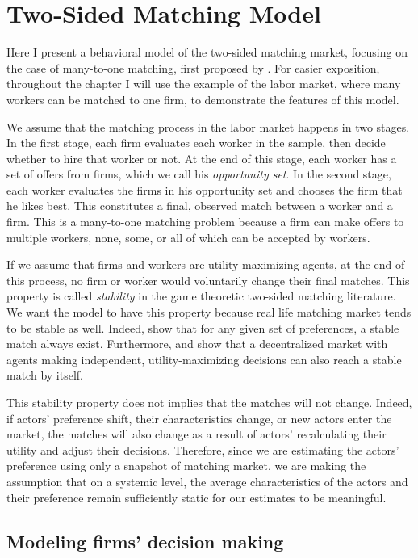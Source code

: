 \chapter{Two-Sided Matching Model}
\label{chap:model}

Here I present a behavioral model of the two-sided matching market, focusing on
the case of many-to-one matching, first proposed by \cite{Logan1996}. For easier exposition, throughout the chapter
I will use the example of the labor market, where many workers can be matched to
one firm, to demonstrate the features of this model.

We assume that the matching process in the labor market happens in two stages.
In the first stage, each firm evaluates each worker in the sample, then
decide whether to hire that worker or not. At the end of this stage, each worker
has a set of offers from firms, which we call his \textit{opportunity
  set}. In the second stage, each worker evaluates the firms in his
opportunity set and chooses the firm that he likes best. This constitutes a
final, observed match between a worker and a firm. This is a many-to-one
matching problem because a firm can make offers to multiple
workers, none, some, or all of which can be accepted by workers.

If we assume that firms and workers are utility-maximizing agents, at the end of
this process, no firm or worker would voluntarily change their final matches.
This property is called \textit{stability} in the game theoretic two-sided
matching literature. We want the model to have this property because real life
matching market tends to be stable as well. Indeed, \citet{Roth1992} show that
for any given set of preferences, a stable match always exist. Furthermore,
\citet{Roth2016} and \citet{Adachi2003} show that a decentralized market with
agents making independent, utility-maximizing decisions can also reach a stable
match by itself.

This stability property does not implies that the matches will not change.
Indeed, if actors' preference shift, their characteristics change, or new actors
enter the market, the matches will also change as a result of actors'
recalculating their utility and adjust their decisions. Therefore, since we are
estimating the actors' preference using only a snapshot of matching market, we
are making the assumption that on a systemic level, the average characteristics of the
actors and their preference remain sufficiently static for our estimates to be meaningful.

\section{Modeling firms' decision making}

